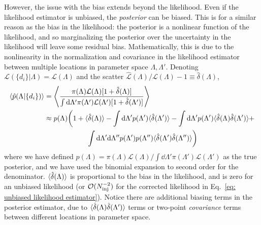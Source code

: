 However, the issue with the bias extends beyond the likelihood. Even if the likelihood estimator is unbiased, the \textit{posterior} can be biased. This is for a similar reason as the bias in the likelihood: the posterior is a nonlinear function of the likelihood, and so marginalizing the posterior over the uncertainty in the likelihood will leave some residual bias. Mathematically, this is due to the nonlinearity in the normalization and covariance in the likelihood estimator between multiple locations in parameter space $\Lambda, \Lambda'$. Denoting $\mathcal{L}(\{d_i\}|\Lambda) = \mathcal{L}(\Lambda)$ and the scatter $\hat{\mathcal{L}}(\Lambda)/\mathcal{L}(\Lambda) -1 \equiv \hat{\delta}(\Lambda)$,
\begin{align}
\langle \hat{p}(\Lambda|\{d_i\})\rangle 
&= \left\langle \frac{\pi(\Lambda)\mathcal{L}(\Lambda)[1 + \hat{\delta}(\Lambda)]}{\int \dd\Lambda' \pi(\Lambda')\mathcal{L}(\Lambda')[1 + \hat{\delta}(\Lambda')]} \right\rangle \label{eq: bias in posterior heuristic} \\
&\approx p(\Lambda)\bigg(1 + \langle \hat{\delta}(\Lambda)\rangle - \int \dd\Lambda' p(\Lambda')\langle \hat{\delta}(\Lambda')\rangle - \int \dd\Lambda' p(\Lambda')\langle \hat{\delta}(\Lambda)\hat{\delta}(\Lambda')\rangle + \\ &\qquad\qquad\qquad\int \dd\Lambda'\dd\Lambda''p(\Lambda')p(\Lambda'')\langle \hat{\delta}(\Lambda')\hat{\delta}(\Lambda'')\rangle\bigg) \nonumber
\end{align}
where we have defined $p(\Lambda) = \pi(\Lambda)\mathcal{L}(\Lambda) / \int \dd\Lambda' \pi(\Lambda')\mathcal{L}(\Lambda')$ as the true posterior, and we have used the binomial expansion to second order for the denominator. 
$\langle \hat{\delta}(\Lambda)\rangle$ is proportional to the bias in the likelihood, and is zero for an unbiased likelihood (or $\mathcal{O}(N_{\rm inj}^{-2})$ for the corrected likelihood in Eq.~\ref{eq: unbiased likelihood estimator}). Notice there are additional biasing terms in the posterior estimator, due to $\langle \hat{\delta}(\Lambda)\hat{\delta}(\Lambda')\rangle$ terms or two-point \textit{covariance} terms between different locations in parameter space. 

